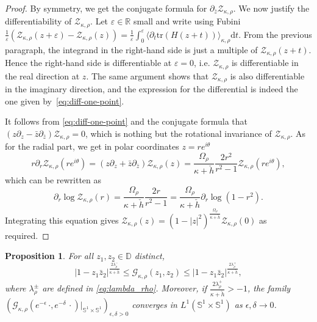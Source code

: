 \documentclass[12pt,a4paper]{amsart}
\numberwithin{equation}{section}
\newtheorem{proposition}[theorem]{Proposition}
\theoremstyle{remark}
\theoremstyle{definition}
\renewcommand{\S}{\mathbb S}
\newcommand{\D}{\mathbb D}
\renewcommand{\d}{\mathrm d}
\newcommand{\del}{\partial}
\newcommand{\R}{\mathbb R}
\newcommand{\tr}{\mathrm{tr}}
\newcommand{\cG}{\mathcal{G}}
\newcommand{\cZ}{\mathcal{Z}}
\begin{document}
\begin{proof}
    By symmetry, we get the conjugate formula for $\del_{\bar z}\cZ_{\kappa,\rho}$. We now justify the differentiability of $\cZ_{\kappa,\rho}$. Let $\varepsilon\in\R$ small and write using Fubini $\frac{1}{\varepsilon}(\cZ_{\kappa,\rho}(z+\varepsilon)-\cZ_{\kappa,\rho}(z))=\frac{1}{\varepsilon}\int_0^\varepsilon\langle\del_t\tr(H(z+t))\rangle_{\kappa,\rho}\d t$. From the previous paragraph, the integrand in the right-hand side is just a multiple of $\cZ_{\kappa,\rho}(z+t)$. Hence the right-hand side is differentiable at $\varepsilon=0$, i.e. $\cZ_{\kappa,\rho}$ is differentiable in the real direction at $z$. The same argument shows that $\cZ_{\kappa,\rho}$ is also differentiable in the imaginary direction, and the expression for the differential is indeed the one given by~\eqref{eq:diff-one-point}.
    
    It follows from \eqref{eq:diff-one-point} and the conjugate formula that $(z\del_z-\bar z\del_{\bar z})\cZ_{\kappa,\rho}=0$, which is nothing but the rotational invariance of $\cZ_{\kappa,\rho}$. As for the radial part, we get in polar coordinates $z=re^{i\theta}$
    \[r\del_r\cZ_{\kappa,\rho}(re^{i\theta})=(z\del_z+\bar z\del_{\bar z})\cZ_{\kappa,\rho}(z)=\frac{\Omega_\rho}{\kappa+\check h}\frac{2r^2}{r^2-1}\cZ_{\kappa,\rho}(re^{i\theta}),\]
    which can be rewritten as
    \[\del_r\log\cZ_{\kappa,\rho}(r)=\frac{\Omega_\rho}{\kappa+\check h}\frac{2r}{r^2-1}=\frac{\Omega_\rho}{\kappa+\check h}\del_r\log(1-r^2).\]
    Integrating this equation gives $\cZ_{\kappa,\rho}(z)=(1-|z|^2)^\frac{\Omega_\rho}{\kappa+\check h}\cZ_{\kappa,\rho}(0)$ as required.
\end{proof}

\begin{proposition}\label{prop:two-point}
    For all $z_1,z_2\in\D$ distinct,
    \begin{equation}\label{eq:bound}
    \left|1-z_1\bar z_2\right|^\frac{2\lambda_\rho^-}{\kappa+\check h}\leq\cG_{\kappa,\rho}(z_1,z_2)\leq\left|1-z_1\bar z_2\right|^\frac{2\lambda_\rho^+}{\kappa+\check h},
    \end{equation}
    where $\lambda_\rho^\pm$ are defined in \eqref{eq:lambda_rho}. Moreover, if $\frac{2\lambda_\rho^+}{\kappa+\check h}>-1$, the family $(\cG_{\kappa,\rho}(e^{-\epsilon}\,\cdot,e^{-\delta}\,\cdot)|_{\S^1\times\S^1})_{\epsilon,\delta>0}$ converges in $L^1(\S^1\times\S^1)$ as $\epsilon,\delta\to0$.
\end{proposition}
\end{document}
